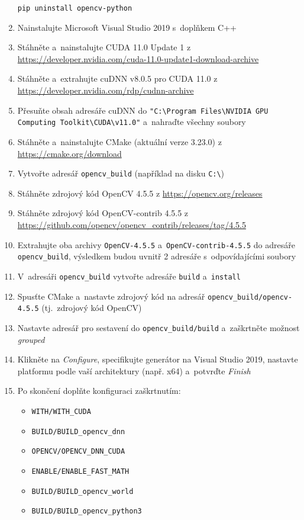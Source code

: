 \begin{enumerate}
    \texttt{pip uninstall opencv-python}
    \item Nainstalujte Microsoft Visual Studio 2019 s~doplňkem C++
    \item Stáhněte a~nainstalujte CUDA 11.0 Update 1 z \newline\url{https://developer.nvidia.com/cuda-11.0-update1-download-archive}
    \item Stáhněte a~extrahujte cuDNN v8.0.5 pro CUDA 11.0 z \newline\url{https://developer.nvidia.com/rdp/cudnn-archive}
    \item Přesuňte obsah adresáře cuDNN do \texttt{"C:\textbackslash Program Files\newline \textbackslash NVIDIA GPU Computing Toolkit\textbackslash CUDA\textbackslash v11.0"} a~nahraďte všechny soubory
    \item Stáhněte a~nainstalujte CMake (aktuální verze 3.23.0) z \newline\url{https://cmake.org/download}
    \item Vytvořte adresář \texttt{opencv\_build} (například na disku \texttt{C:\textbackslash})
    \item Stáhněte zdrojový kód OpenCV 4.5.5 z \url{https://opencv.org/releases}
    \item Stáhněte zdrojový kód OpenCV-contrib 4.5.5 z \newline\url{https://github.com/opencv/opencv_contrib/releases/tag/4.5.5}
    \item Extrahujte oba archivy \texttt{OpenCV-4.5.5} a~\texttt{OpenCV-contrib-4.5.5} do adresáře \newline\texttt{opencv\_build}, výsledkem budou uvnitř 2 adresáře s~odpovídajícími soubory
    \item V~adresáři \texttt{opencv\_build} vytvořte adresáře \texttt{build} a~\texttt{install}
    \item Spusťte CMake a~nastavte zdrojový kód na adresář \texttt{opencv\_build/opencv-4.5.5} (tj.~zdrojový kód OpenCV)
    \item Nastavte adresář pro sestavení do \texttt{opencv\_build/build} a~zaškrtněte možnost \emph{grouped}
    \item Klikněte na \emph{Configure}, specifikujte generátor na Visual Studio 2019, nastavte platformu podle vaší architektury (např. x64) a~potvrďte \emph{Finish}
    \item Po skončení doplňte konfiguraci zaškrtnutím:
    \begin{itemize}
        \item \texttt{WITH/WITH\_CUDA}
        \item \texttt{BUILD/BUILD\_opencv\_dnn}
        \item \texttt{OPENCV/OPENCV\_DNN\_CUDA}
        \item \texttt{ENABLE/ENABLE\_FAST\_MATH}
        \item \texttt{BUILD/BUILD\_opencv\_world}
        \item \texttt{BUILD/BUILD\_opencv\_python3}
    \end{itemize}


\end{enumerate}
